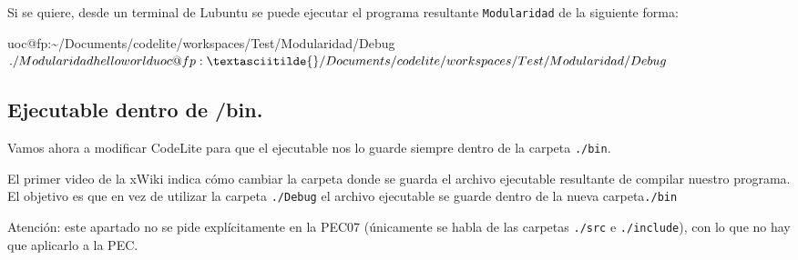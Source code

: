 \documentclass[
]{book}
\newenvironment{Shaded}{\begin{snugshade}}{\end{snugshade}}
\newcommand{\DecValTok}[1]{\textcolor[rgb]{0.00,0.00,0.81}{#1}}
\newcommand{\NormalTok}[1]{#1}
\begin{document}
\begin{Shaded}
\end{Shaded}

Si se quiere, desde un terminal de Lubuntu se puede ejecutar el programa resultante \texttt{Modularidad} de la siguiente forma:

\begin{Shaded}
\begin{Highlighting}[]
\NormalTok{uoc@fp:\textasciitilde{}/Documents/codelite/workspaces/Test/Modularidad/Debug$ ./Modularidad}
\NormalTok{hello world}
\NormalTok{uoc@fp:\textasciitilde{}/Documents/codelite/workspaces/Test/Modularidad/Debug$}
\end{Highlighting}
\end{Shaded}

\hypertarget{ejecutable-dentro-de-bin.}{%
\subsection{Ejecutable dentro de /bin.}\label{ejecutable-dentro-de-bin.}}

Vamos ahora a modificar CodeLite para que el ejecutable nos lo guarde siempre dentro de la carpeta \texttt{./bin}.

El primer video de la xWiki indica cómo cambiar la carpeta donde se guarda el archivo ejecutable resultante de compilar nuestro programa. El objetivo es que en vez de utilizar la carpeta \texttt{./Debug} el archivo ejecutable se guarde dentro de la nueva carpeta\texttt{./bin}

Atención: este apartado no se pide explícitamente en la PEC07 (únicamente se habla de las carpetas \texttt{./src} e \texttt{./include}), con lo que no hay que aplicarlo a la PEC.
\end{document}
